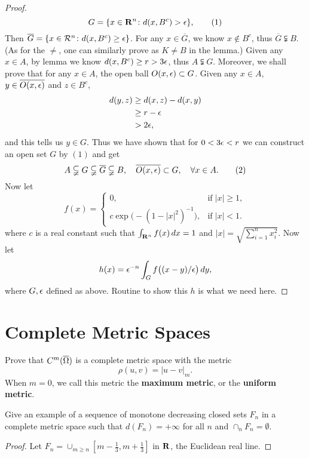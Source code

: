 \begin{proof}
	\[G=\{x\in \mathbf{R}^n\colon d(x,B^c)>\epsilon\},\tag{1}\]
	Then $\overline{G}=\{x\in \mathcal{R}^n\colon d(x,B^c)\geq \epsilon\}$. For any $x\in \overline{G}$, we know $x\notin B^c$, thus $\overline{G}\subsetneqq B$. (As for the $\neq$, one can similarly prove as $K\neq B$ in the lemma.) Given any $x\in A$, by lemma we know $d(x,B^c)\geq r>3\epsilon$, thus $A\subsetneqq G$. Moreover, we shall prove that for any $x\in A$, the open ball $O(x,\epsilon)\subset G$. Given any $x\in A$, $y\in \overline{O(x,\epsilon)}$ and $z\in B^c$, 
	\begin{align*}
		d(y,z)&\geq d(x,z)-d(x,y)\\
			  &\geq r-\epsilon\\
			  &>2\epsilon,
	\end{align*}
	and this tells us $y\in G$. Thus we have shown that for $0<3\epsilon<r$ we can construct an open set $G$ by $(1)$ and get
	\[A\subsetneqq G\subsetneqq\overline{G}\subsetneqq B,\quad \overline{O(x,\epsilon)}\subset G,\quad\forall x\in A.\tag{2}\]
	Now let 
	\[f(x)=\begin{cases}
	0,&\mbox{if}\;|x|\geq 1,\\
	c\exp\big(-(1-|x|^2)^{-1}\big),&\mbox{if}\;|x|<1.\end{cases}\]
	where $c$ is a real constant such that $\int_{\mathbf{R}^n} f(x)\,dx=1$ and $|x|=\sqrt{\sum_{i=1}^n x_i^2}$. Now let
	\[h(x)=\epsilon^{-n}\int_G f\big((x-y)/\epsilon\big)\,dy,\]
	where $G,\epsilon$ defined as above. Routine to show this $h$ is what we need here.
\end{proof}

\section{Complete Metric Spaces}
\begin{pro}%
	Prove that $C^m(\overline{\Omega})$ is a complete metric space with the metric 
	\[\rho(u,v)=|u-v|_m.\]
	When $m=0$, we call this metric the \textbf{maximum metric}, or the \textbf{uniform metric}.
\end{pro}

\begin{pro}%
	Give an example of a sequence of monotone decreasing closed sets $F_n$ in a complete metric space such that $d(F_n)=+\infty$ for all $n$ and $\cap_n F_n=\emptyset$.
\end{pro}
\begin{proof}
	Let $F_n=\cup_{m\geq n} [m-\tfrac{1}{3},m+\tfrac{1}{3}]$ in $\mathbf{R}$, the Euclidean real line. 
\end{proof}

